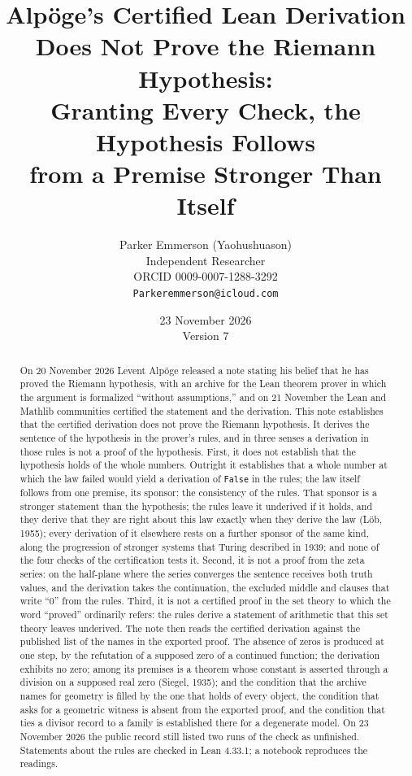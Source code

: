 \documentclass[11pt]{article}
\title{Alp\"oge's Certified Lean Derivation\\ Does Not Prove the Riemann Hypothesis:\\[4pt] \large Granting Every Check, the Hypothesis Follows\\ from a Premise Stronger Than Itself}
\author{Parker Emmerson (Yaohushuason)\\[2pt]
\small Independent Researcher\\
\small ORCID 0009-0007-1288-3292\\
\small \texttt{Parkeremmerson@icloud.com}}
\date{23 November 2026\\[2pt]\small Version 7}
\theoremstyle{definition}
\theoremstyle{remark}
\DeclareRobustCommand{\lean}[1]{{\renewcommand{\_}{\textunderscore\allowbreak}\texttt{#1}}}
\newcommand{\False}{\lean{False}}
\begin{document}
\maketitle


\begin{abstract}
On 20 November 2026 Levent Alp\"oge released a note stating his belief that he has proved the Riemann hypothesis, with an archive for the Lean theorem prover in which the argument is formalized ``without assumptions,'' and on 21 November the Lean and Mathlib communities certified the statement and the derivation. This note establishes that the certified derivation does not prove the Riemann hypothesis. It derives the sentence of the hypothesis in the prover's rules, and in three senses a derivation in those rules is not a proof of the hypothesis. First, it does not establish that the hypothesis holds of the whole numbers. Outright it establishes that a whole number at which the law failed would yield a derivation of \False{} in the rules; the law itself follows from one premise, its sponsor: the consistency of the rules. That sponsor is a stronger statement than the hypothesis; the rules leave it underived if it holds, and they derive that they are right about this law exactly when they derive the law (L\"ob, 1955); every derivation of it elsewhere rests on a further sponsor of the same kind, along the progression of stronger systems that Turing described in 1939; and none of the four checks of the certification tests it. Second, it is not a proof from the zeta series: on the half-plane where the series converges the sentence receives both truth values, and the derivation takes the continuation, the excluded middle and clauses that write ``0'' from the rules. Third, it is not a certified proof in the set theory to which the word ``proved'' ordinarily refers: the rules derive a statement of arithmetic that this set theory leaves underived. The note then reads the certified derivation against the published list of the names in the exported proof. The absence of zeros is produced at one step, by the refutation of a supposed zero of a continued function; the derivation exhibits no zero; among its premises is a theorem whose constant is asserted through a division on a supposed real zero (Siegel, 1935); and the condition that the archive names for geometry is filled by the one that holds of every object, the condition that asks for a geometric witness is absent from the exported proof, and the condition that ties a divisor record to a family is established there for a degenerate model. On 23 November 2026 the public record still listed two runs of the check as unfinished. Statements about the rules are checked in Lean 4.33.1; a notebook reproduces the readings.
\end{abstract}
\end{document}
